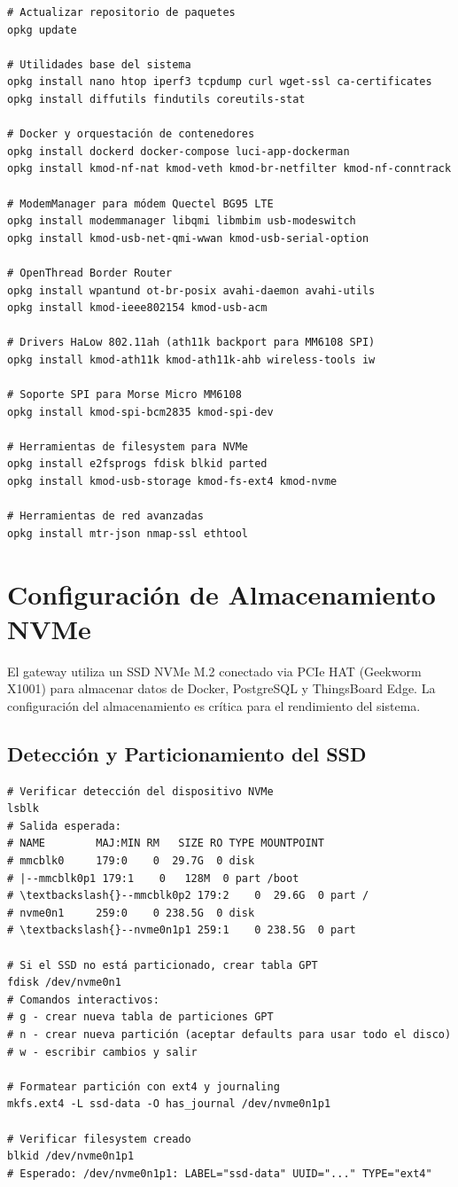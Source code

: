 \begin{verbatim}
# Actualizar repositorio de paquetes
opkg update

# Utilidades base del sistema
opkg install nano htop iperf3 tcpdump curl wget-ssl ca-certificates
opkg install diffutils findutils coreutils-stat

# Docker y orquestación de contenedores
opkg install dockerd docker-compose luci-app-dockerman
opkg install kmod-nf-nat kmod-veth kmod-br-netfilter kmod-nf-conntrack

# ModemManager para módem Quectel BG95 LTE
opkg install modemmanager libqmi libmbim usb-modeswitch
opkg install kmod-usb-net-qmi-wwan kmod-usb-serial-option

# OpenThread Border Router
opkg install wpantund ot-br-posix avahi-daemon avahi-utils
opkg install kmod-ieee802154 kmod-usb-acm

# Drivers HaLow 802.11ah (ath11k backport para MM6108 SPI)
opkg install kmod-ath11k kmod-ath11k-ahb wireless-tools iw

# Soporte SPI para Morse Micro MM6108
opkg install kmod-spi-bcm2835 kmod-spi-dev

# Herramientas de filesystem para NVMe
opkg install e2fsprogs fdisk blkid parted
opkg install kmod-usb-storage kmod-fs-ext4 kmod-nvme

# Herramientas de red avanzadas
opkg install mtr-json nmap-ssl ethtool
\end{verbatim}

\section{Configuración de Almacenamiento NVMe}

El gateway utiliza un SSD NVMe M.2 conectado via PCIe HAT (Geekworm X1001) para almacenar datos de Docker, PostgreSQL y ThingsBoard Edge. La configuración del almacenamiento es crítica para el rendimiento del sistema.

\subsection{Detección y Particionamiento del SSD}

\begin{verbatim}
# Verificar detección del dispositivo NVMe
lsblk
# Salida esperada:
# NAME        MAJ:MIN RM   SIZE RO TYPE MOUNTPOINT
# mmcblk0     179:0    0  29.7G  0 disk 
# |--mmcblk0p1 179:1    0   128M  0 part /boot
# \textbackslash{}--mmcblk0p2 179:2    0  29.6G  0 part /
# nvme0n1     259:0    0 238.5G  0 disk 
# \textbackslash{}--nvme0n1p1 259:1    0 238.5G  0 part

# Si el SSD no está particionado, crear tabla GPT
fdisk /dev/nvme0n1
# Comandos interactivos:
# g - crear nueva tabla de particiones GPT
# n - crear nueva partición (aceptar defaults para usar todo el disco)
# w - escribir cambios y salir

# Formatear partición con ext4 y journaling
mkfs.ext4 -L ssd-data -O has_journal /dev/nvme0n1p1

# Verificar filesystem creado
blkid /dev/nvme0n1p1
# Esperado: /dev/nvme0n1p1: LABEL="ssd-data" UUID="..." TYPE="ext4"
\end{verbatim}

